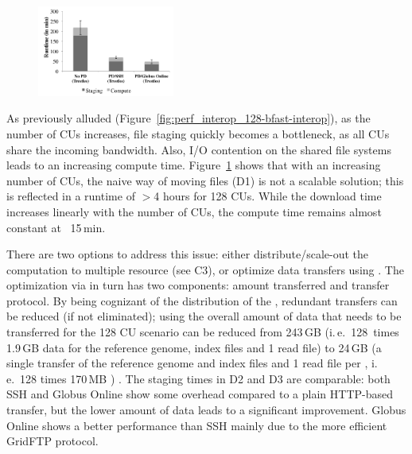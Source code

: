 \documentclass[conference]{IEEEtran}
\begin{document}
\begin{figure}[t]
	\upp
	\centering
		\includegraphics[width=0.4\textwidth]{../perf/sc/pd-128cus.pdf}
	\caption{}
	\label{fig:perf_sc_download-concurrent-cus}
\end{figure}


As previously alluded
(Figure~\ref{fig:perf_interop_128-bfast-interop}), as the number of
CUs increases, file staging quickly becomes a bottleneck, as all CUs
share the incoming bandwidth.  Also, I/O contention on the shared file
systems leads to an increasing compute time.
Figure~\ref{fig:perf_sc_download-concurrent-cus} shows that with an
increasing number of CUs, the naive way of moving files (D1) is not a
scalable solution; this is reflected in a runtime of $>$4 hours for 128
CUs.  While the download time increases linearly with the number of
CUs, the compute time remains almost constant at ~15\,min.

There are two options to address this issue: either
distribute/scale-out the computation to multiple resource (see C3), or
optimize data transfers using \pilotdata.  The optimization via
\pilotdata in turn has two components: amount transferred and transfer
protocol.  By being cognizant of the distribution of the \cus,
redundant transfers can be reduced (if not eliminated); using
\pilotdata the overall amount of data that needs to be transferred for
the 128 CU scenario can be reduced from 243\,GB (i.\,e.\ 128\,\cus
times 1.9\,GB data for the reference genome, index files and 1 read
file) to 24\,GB (a single transfer of the reference genome and index
files and 1 read file per \cu, i.\,e.\ 128 times 170\,MB ) .  The
staging times in D2 and D3 are comparable: both SSH and Globus Online
show some overhead compared to a plain HTTP-based transfer, but the
lower amount of data leads to a significant improvement.  Globus
Online shows a better performance than SSH mainly due to the more
efficient GridFTP protocol.
\end{document}
